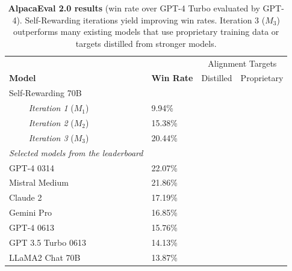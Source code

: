 \documentclass{article}
\newcommand{\cmark}{\ding{51}}%
\begin{document}
\begin{table}[h]
    \caption{
    {\bf AlpacaEval 2.0 results} (win rate over GPT-4 Turbo evaluated by GPT-4). Self-Rewarding iterations yield improving  win rates. Iteration 3 ($M_3$) outperforms many existing models that use proprietary training data or targets distilled from stronger models.
    }
    \vspace{2mm}
  \label{tab:alpaca_leaderb}
  \centering

  \begin{tabular}{llcc}
    \toprule
                   &                          & \multicolumn{2}{c}{ Alignment Targets} \\
    \textbf{Model} &    \textbf{Win Rate}  & Distilled & Proprietary\\
    \midrule  
    Self-Rewarding 70B \\
    ~~~~ {\em Iteration 1} ($M_1$) & 9.94\% & \\ %
    ~~~~ {\em Iteration 2} ($M_2$) & 15.38\%&   \\ %
    ~~~~ {\em Iteration 3} ($M_3$) & 20.44\% & \\ %
    \midrule  
     \midrule 
   {\em Selected models from the leaderboard}\\
   GPT-4 0314	& 22.07\% &   & \cmark  \\ %
   Mistral Medium & 	21.86\% &   & \cmark   \\ %
   Claude 2 &	17.19\%&   & \cmark  	\\ %
   Gemini Pro &	16.85\%  &   & \cmark  \\	%
   GPT-4 0613 &	15.76\% &   & \cmark  	\\	%
   GPT 3.5 Turbo 0613	&14.13\%  &   & \cmark  \\ %
   LLaMA2 Chat 70B &	13.87\% &   & \cmark   \\ %

\end{tabular}
\end{table}
\end{document}
